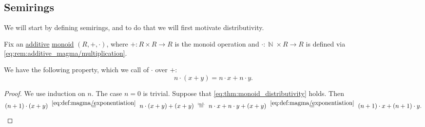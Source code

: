 \subsection{Semirings}\label{subsec:semirings}

We will start by defining semirings, and to do that we will first motivate distributivity.

\begin{proposition}\label{thm:monoid_distributivity}
  Fix an \hyperref[rem:additive_magma/multiplication]{additive} \hyperref[def:monoid]{monoid} \( (R, +, \cdot) \), where \( +: R \times R \to R \) is the monoid operation and \( \cdot: \BbbN \times R \to R \) is defined via \eqref{eq:rem:additive_magma/multiplication}.

  We have the following property, which we call  of \( \cdot \) over \( + \):
  \begin{equation}\label{eq:thm:monoid_distributivity}
    n \cdot (x + y) = n \cdot x + n \cdot y.
  \end{equation}
\end{proposition}
\begin{proof}
  We use induction on \( n \). The case \( n = 0 \) is trivial. Suppose that \eqref{eq:thm:monoid_distributivity} holds. Then
  \begin{equation*}
    (n + 1) \cdot (x + y)
    \reloset {\eqref{eq:def:magma/exponentiation}} =
    n \cdot (x + y) + (x + y)
    \reloset {\T{ind.}} =
    n \cdot x + n \cdot y + (x + y)
    \reloset {\eqref{eq:def:magma/exponentiation}} =
    (n + 1) \cdot x + (n + 1) \cdot y.
  \end{equation*}
\end{proof}

